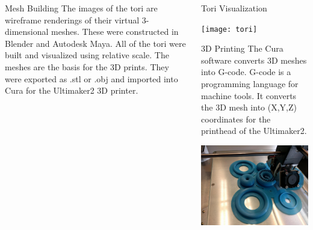 \documentclass{beamer}
\begin{document}
\begin{frame}{}
\begin{columns}[t]
\begin{column}{0.245\linewidth}
\begin{block}{Mesh Building}
The images of the tori are wireframe renderings of their virtual 3-dimensional meshes. These were constructed in Blender and Autodesk Maya. All of the tori were built and visualized using relative scale. The meshes are the basis for the 3D prints. They were exported as .stl or .obj and imported into Cura for the Ultimaker2 3D printer. 
\end{block}




\end{column}%


\begin{column}{0.245\linewidth}


\begin{block}{Tori Visualization}
\vspace{0.5em}

\begin{center}
\texttt{[image: tori]}\\[1em]

\end{center}
\end{block}


\begin{block}{3D Printing}
The Cura software converts 3D meshes into G-code. G-code is a programming language for machine tools. It converts the 3D mesh into (X,Y,Z) coordinates for the printhead of the Ultimaker2. 
\begin{center}
\includegraphics[scale = 0.25]{printing}
\end{center}
\end{block}


\end{column}
\end{columns}
\end{frame}
\end{document}
